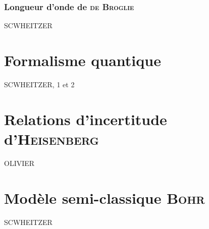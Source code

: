 \documentclass[../main/main.tex]{subfiles}
\begin{document}
\subsubsection{Longueur d'onde de \textsc{de Broglie}}
\label{sssec:lgdb}
SCWHEITZER

\section{Formalisme quantique}
\label{sec:formQ}
SCWHEITZER, 1 et 2

\section{Relations d'incertitude d'\textsc{Heisenberg}}
\label{sec:heis}
OLIVIER

\section{Modèle semi-classique \textsc{Bohr}}
\label{sec:bohr}
SCWHEITZER
\end{document}
